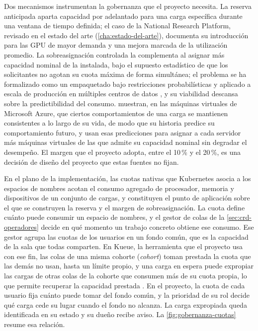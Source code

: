 Dos mecanismos instrumentan la gobernanza que el proyecto necesita. La reserva anticipada aparta capacidad por adelantado para una carga específica durante una ventana de tiempo definida; el caso de la National Research Platform, revisado en el estado del arte (\cref{cha:estado-del-arte}), documenta su introducción para las GPU de mayor demanda y una mejora marcada de la utilización promedio. La sobreasignación controlada la complementa al asignar más capacidad nominal de la instalada, bajo el supuesto estadístico de que los solicitantes no agotan su cuota máxima de forma simultánea; el problema se ha formalizado como un empaquetado bajo restricciones probabilísticas \citep{cohen-cloudovercommit-2019} y aplicado a escala de producción en múltiples centros de datos \citep{bashir-peakovercommit-2021}, y su viabilidad descansa sobre la predictibilidad del consumo. \citet{cortez-resourcecentral-2017} muestran, en las máquinas virtuales de Microsoft Azure, que ciertos comportamientos de una carga se mantienen consistentes a lo largo de su vida, de modo que su historia predice su comportamiento futuro, y usan esas predicciones para asignar a cada servidor más máquinas virtuales de las que admite su capacidad nominal sin degradar el desempeño. El margen que el proyecto adopta, entre el 10\,\% y el 20\,\%, es una decisión de diseño del proyecto que estas fuentes no fijan.

En el plano de la implementación, las cuotas nativas que Kubernetes asocia a los espacios de nombres acotan el consumo agregado de procesador, memoria y dispositivos de un conjunto de cargas, y constituyen el punto de aplicación sobre el que se construyen la reserva y el margen de sobreasignación. La cuota define cuánto puede consumir un espacio de nombres, y el gestor de colas de la \cref{sec:crd-operadores} decide en qué momento un trabajo concreto obtiene ese consumo. Ese gestor agrupa las cuotas de los usuarios en un fondo común, que es la capacidad de la sala que todas comparten. En Kueue, la herramienta que el proyecto usa con ese fin, las colas de una misma cohorte (\emph{cohort}) toman prestada la cuota que las demás no usan, hasta un límite propio, y una carga en espera puede expropiar las cargas de otras colas de la cohorte que consumen más de su cuota propia, lo que permite recuperar la capacidad prestada \citep{kueue-clusterqueue-2026}. En el proyecto, la cuota de cada usuario fija cuánto puede tomar del fondo común, y la prioridad de su rol decide qué carga cede su lugar cuando el fondo no alcanza. La carga expropiada queda identificada en su estado y su dueño recibe aviso. La \cref{fig:gobernanza-cuotas} resume esa relación.

